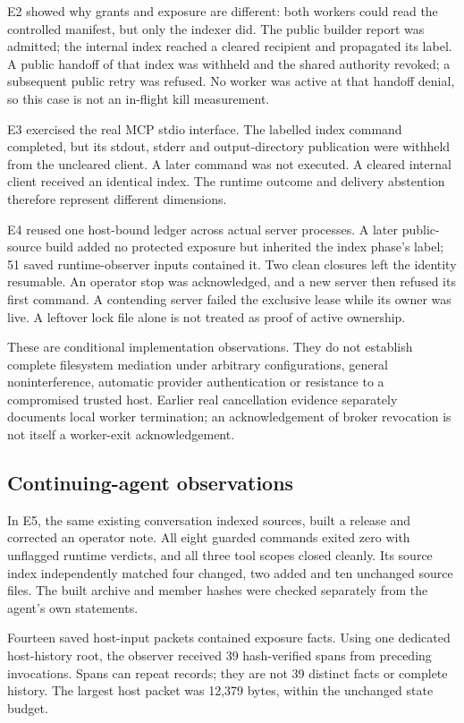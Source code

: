 \documentclass[conference]{IEEEtran}
\begin{document}
E2 showed why grants and exposure are different: both workers could read the controlled manifest, but only the indexer did. The public builder report was admitted; the internal index reached a cleared recipient and propagated its label. A public handoff of that index was withheld and the shared authority revoked; a subsequent public retry was refused. No worker was active at that handoff denial, so this case is not an in-flight kill measurement.

E3 exercised the real MCP stdio interface. The labelled index command completed, but its stdout, stderr and output-directory publication were withheld from the uncleared client. A later command was not executed. A cleared internal client received an identical index. The runtime outcome and delivery abstention therefore represent different dimensions.

E4 reused one host-bound ledger across actual server processes. A later public-source build added no protected exposure but inherited the index phase's label; 51 saved runtime-observer inputs contained it. Two clean closures left the identity resumable. An operator stop was acknowledged, and a new server then refused its first command. A contending server failed the exclusive lease while its owner was live. A leftover lock file alone is not treated as proof of active ownership.

These are conditional implementation observations. They do not establish complete filesystem mediation under arbitrary configurations, general noninterference, automatic provider authentication or resistance to a compromised trusted host. Earlier real cancellation evidence separately documents local worker termination; an acknowledgement of broker revocation is not itself a worker-exit acknowledgement.

\subsection{Continuing-agent observations}\label{continuing-agent-observations}

In E5, the same existing conversation indexed sources, built a release and corrected an operator note. All eight guarded commands exited zero with unflagged runtime verdicts, and all three tool scopes closed cleanly. Its source index independently matched four changed, two added and ten unchanged source files. The built archive and member hashes were checked separately from the agent's own statements.

Fourteen saved host-input packets contained exposure facts. Using one dedicated host-history root, the observer received 39 hash-verified spans from preceding invocations. Spans can repeat records; they are not 39 distinct facts or complete history. The largest host packet was 12,379 bytes, within the unchanged state budget.
\end{document}
